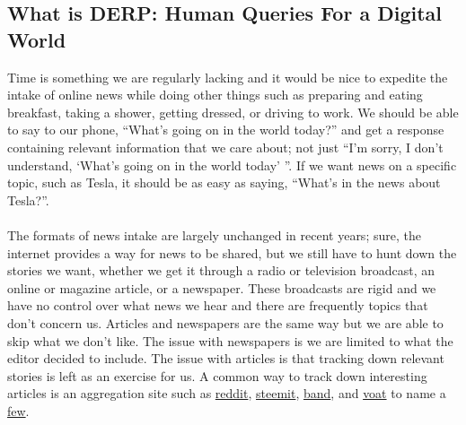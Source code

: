 \documentclass{article}
\begin{document}
\subsection{What is DERP: Human Queries For a Digital World}\label{sec:whatisDERP}
Time is something we are regularly lacking and it would be nice to expedite the intake of online news while doing other things such as preparing and eating breakfast, taking a shower, getting dressed, or driving to work. We should be able to say to our phone, ``What's going on in the world today?'' and get a response containing relevant information that we care about; not just ``I'm sorry, I don't understand, `What's going on in the world today' ''. If we want news on a specific topic, such as Tesla, it should be as easy as saying, ``What's in the news about Tesla?''. \\ \\
The formats of news intake are largely unchanged in recent years; sure, the internet provides a way for news to be shared, but we still have to hunt down the stories we want, whether we get it through a radio or television broadcast, an online or magazine article, or a newspaper. These broadcasts are rigid and we have no control over what news we hear and there are frequently topics that don't concern us. Articles and newspapers are the same way but we are able to skip what we don't like. The issue with newspapers is we are limited to what the editor decided to include. The issue with articles is that tracking down relevant stories is left as an exercise for us. A common way to track down interesting articles is an aggregation site such as \href{https://www.reddit.com}{reddit}, \href{https://steemit.com/}{steemit}, \href{https://band.us/home}{band}, and \href{https://voat.co/}{voat} to name a \href{https://www.reddit.com/r/RedditAlternatives/comments/8585ox/list_of_active_reddit_alternatives/}{few}.
\end{document}
